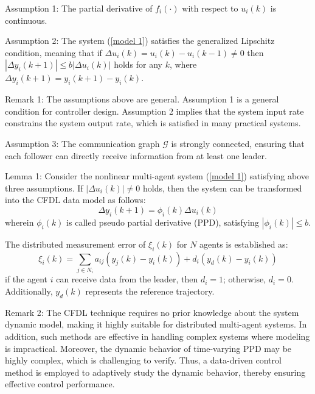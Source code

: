 \documentclass[journal,onecolumn]{IEEEtran}
\begin{document}
Assumption 1: The partial derivative of \( f_i(\cdot) \) with respect to \( u_i(k) \) is continuous.

Assumption 2: The system (\ref{model 1}) satisfies the generalized Lipschitz condition, meaning that if \( \Delta u_i(k) = u_i(k) - u_i(k - 1) \neq 0 \) then \( | \Delta y_i(k + 1) | \leq b |\Delta u_i(k)| \) holds for any \( k \), where \( \Delta y_i(k + 1) = y_i(k + 1) - y_i(k) \).
 


Remark 1: The assumptions above are general. Assumption 1 is a general condition for controller design. Assumption 2 implies that the system input rate constrains the system output rate, which is satisfied in many practical systems.

Assumption 3: The communication graph $ \mathcal{G} $ is strongly connected, ensuring that each follower can directly receive information from at least one leader.

Lemma 1\cite{8}: Consider the nonlinear multi-agent system (\ref{model 1}) satisfying above three assumptions. If $ | \Delta u_i(k) | \neq 0 $ holds, then the system can be transformed into the CFDL data model as follows:
\begin{equation}
    \label{model 2}
    \Delta y_i(k+1)=\phi_i(k)\Delta u_i(k)
\end{equation}
wherein \(\phi_i(k)\) is called pseudo partial derivative (PPD), satisfying \( | \phi_i(k) | \leq b\).
 
The distributed measurement error of \(\xi_i(k)\) for $N$ agents is established as:
\begin{equation}
    \label{model 3}
    \xi_i(k) = \sum_{j \in N_i} a_{ij}( y_j(k)-y_i(k)) + d_i(y_d(k) - y_i(k ))
\end{equation}
if the agent $ i $ can receive data from the leader, then $d_i=1$; otherwise, $d_i=0$. Additionally, $y_d(k)$ represents the reference trajectory. 

Remark 2: The CFDL technique requires no prior knowledge about the system dynamic model, making it highly suitable for distributed multi-agent systems. In addition, such methods are effective in handling complex systems where modeling is impractical. Moreover, the dynamic behavior of time-varying PPD may be highly complex, which is challenging to verify. Thus, a data-driven control method is employed to adaptively study the dynamic behavior, thereby ensuring effective control performance.
 
\end{document}
